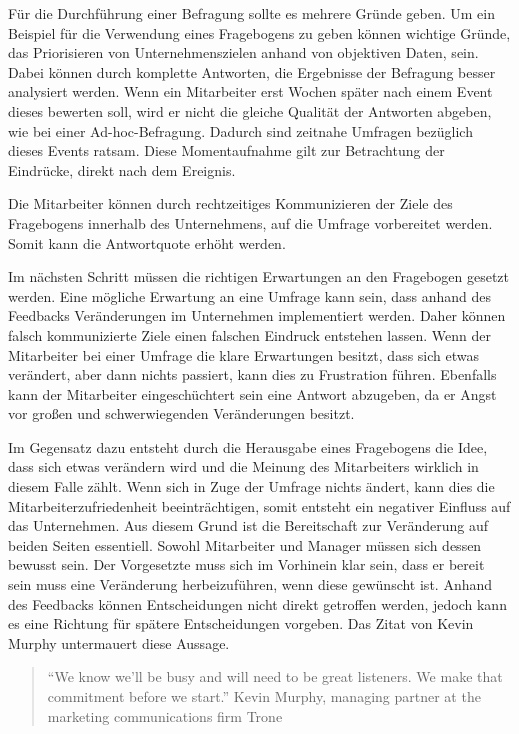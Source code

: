 Für die Durchführung einer Befragung sollte es mehrere Gründe geben. 
Um ein Beispiel für die Verwendung eines Fragebogens zu geben können wichtige Gründe, das Priorisieren von Unternehmenszielen anhand von objektiven Daten, sein. 
Dabei können durch komplette Antworten, die Ergebnisse der Befragung besser analysiert werden. 
Wenn ein Mitarbeiter erst Wochen später nach einem Event dieses bewerten soll, wird er nicht die gleiche Qualität der Antworten abgeben, wie bei einer Ad-hoc-Befragung.
Dadurch sind zeitnahe Umfragen bezüglich dieses Events ratsam. 
Diese Momentaufnahme gilt zur Betrachtung der Eindrücke, direkt nach dem Ereignis.

Die Mitarbeiter können durch rechtzeitiges Kommunizieren der Ziele des Fragebogens innerhalb des Unternehmens, auf die Umfrage vorbereitet werden. 
Somit kann die Antwortquote erhöht werden. 

Im nächsten Schritt müssen die richtigen Erwartungen an den Fragebogen gesetzt werden. 
Eine mögliche Erwartung an eine Umfrage kann sein, dass anhand des Feedbacks Veränderungen im Unternehmen implementiert werden. 
Daher können falsch kommunizierte Ziele einen falschen Eindruck entstehen lassen.
Wenn der Mitarbeiter bei einer Umfrage die klare Erwartungen besitzt, dass sich etwas verändert, aber dann nichts passiert, kann dies zu Frustration führen.
Ebenfalls kann der Mitarbeiter eingeschüchtert sein eine Antwort abzugeben, da er Angst vor großen und schwerwiegenden Veränderungen besitzt\autocite[Chapter 3
Setting Expectations]{Perfect}.

Im Gegensatz dazu entsteht durch die Herausgabe eines Fragebogens die Idee, dass sich etwas verändern wird und die Meinung des Mitarbeiters wirklich in diesem Falle zählt.
Wenn sich in Zuge der Umfrage nichts ändert, kann dies die Mitarbeiterzufriedenheit beeinträchtigen, somit entsteht ein negativer Einfluss auf das Unternehmen.
Aus diesem Grund ist die Bereitschaft zur Veränderung auf beiden Seiten essentiell. 
Sowohl Mitarbeiter und Manager müssen sich dessen bewusst sein.
Der Vorgesetzte muss sich im Vorhinein klar sein, dass er bereit sein muss eine Veränderung herbeizuführen, wenn diese gewünscht ist.
Anhand des Feedbacks können Entscheidungen nicht direkt getroffen werden, jedoch kann es eine Richtung für spätere Entscheidungen vorgeben. 
Das Zitat von Kevin Murphy untermauert diese Aussage\autocite[Chapter 3
Setting Expectations]{Perfect}.
\begin{quote} \enquote{We know we’ll be busy and will need to be great listeners. We make that commitment before we start.} Kevin Murphy, managing partner at the marketing communications firm Trone \end{quote}

